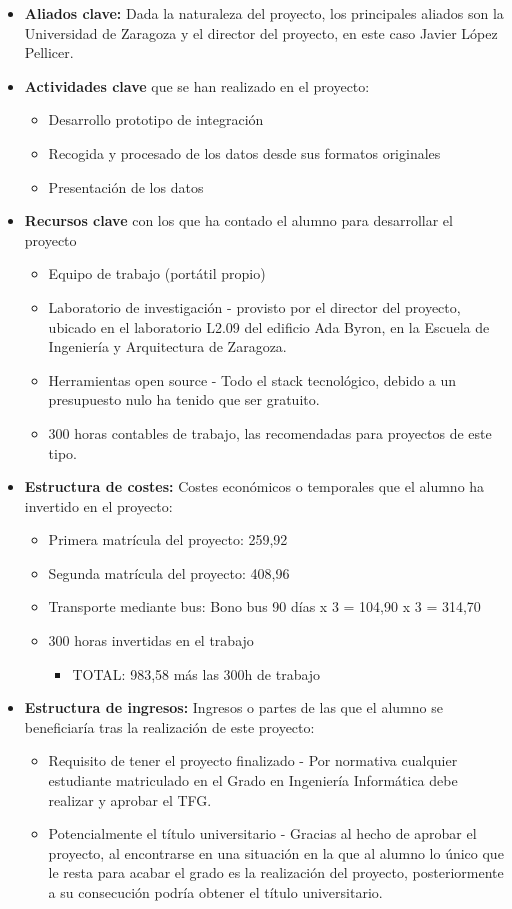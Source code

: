 \begin{itemize}
\item \textbf{Aliados clave:} Dada la naturaleza del proyecto, los principales aliados son la Universidad de Zaragoza y el director del proyecto, en este caso Javier López Pellicer.
\item \textbf{Actividades clave} que se han realizado en el proyecto:
\begin{itemize}
\item Desarrollo prototipo de integración
\item Recogida y procesado de los datos desde sus formatos originales
\item Presentación de los datos
\end{itemize}
\item \textbf{Recursos clave} con los que ha contado el alumno para desarrollar el proyecto 
\begin{itemize}
\item Equipo de trabajo (portátil propio)
\item Laboratorio de investigación - provisto por el director del proyecto, ubicado en el laboratorio L2.09 del edificio Ada Byron, en la Escuela de Ingeniería y Arquitectura de Zaragoza.
\item Herramientas open source - Todo el stack tecnológico, debido a un presupuesto nulo ha tenido que ser gratuito.
\item 300 horas contables de trabajo, las recomendadas para proyectos de este tipo.
\end{itemize}
\item \textbf{Estructura de costes:} Costes económicos o temporales que el alumno ha invertido en el proyecto:
\begin{itemize}
\item Primera matrícula del proyecto: 259,92
\item Segunda matrícula del proyecto: 408,96
\item Transporte mediante bus: Bono bus 90 días x 3 = 104,90 x 3 = 314,70
\item 300 horas invertidas en el trabajo
\begin{itemize}
\item TOTAL: 983,58 más las 300h de trabajo
\end{itemize}
\end{itemize}
\item \textbf{Estructura de ingresos:} Ingresos o partes de las que el alumno se beneficiaría tras la realización de este proyecto:
\begin{itemize}
\item Requisito de tener el proyecto finalizado - Por normativa cualquier estudiante matriculado en el Grado en Ingeniería Informática debe realizar y aprobar el TFG.
\item Potencialmente el título universitario - Gracias al hecho de aprobar el proyecto, al encontrarse en una situación en la que al alumno lo único que le resta para acabar el grado es la realización del proyecto, posteriormente a su consecución podría obtener el título universitario. 
\end{itemize}
\end{itemize}

